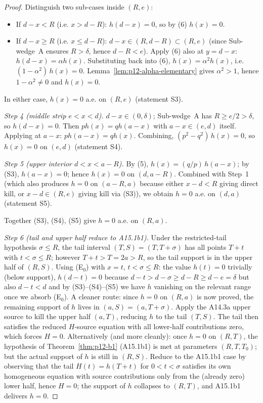 \begin{proof}
Distinguish two sub-cases inside $(R, e)$:
\begin{itemize}
\item If $d - x < R$ (i.e. $x > d - R$): $h(d - x) = 0$, so by (6)
$h(x) = 0$.
\item If $d - x \ge R$ (i.e. $x \le d - R$): $d - x \in (R, d - R)
\subset (R, e)$ (since Sub-wedge~A ensures $R > \delta$, hence
$d - R < e$).  Apply (6) also at $y = d - x$:
$h(d - x) = \alpha h(x)$.  Substituting back into (6),
$h(x) = \alpha^2 h(x)$, i.e. $(1 - \alpha^2)\, h(x) = 0$.
Lemma~\ref{lem:p12-alpha-elementary} gives $\alpha^2 > 1$, hence
$1 - \alpha^2 \ne 0$ and $h(x) = 0$.
\end{itemize}
In either case, $h(x) = 0$ a.e. on $(R, e)$ (statement S3).

\medskip
\noindent\emph{Step 4 (middle strip $e < x < d$).}
$d - x \in (0, \delta)$; Sub-wedge~A has $R \ge e/2 > \delta$, so
$h(d - x) = 0$.  Then $p h(x) = q h(a - x)$ with $a - x \in (e, d)$
itself.  Applying at $a - x$: $p h(a - x) = q h(x)$.  Combining,
$(p^2 - q^2)\, h(x) = 0$, so $h(x) = 0$ on $(e, d)$ (statement S4).

\medskip
\noindent\emph{Step 5 (upper interior $d < x < a - R$).}
By (5), $h(x) = (q/p)\, h(a - x)$; by (S3), $h(a - x) = 0$; hence
$h(x) = 0$ on $(d, a - R)$.  Combined with Step~1 (which also produces
$h = 0$ on $(a - R, a)$ because either $x - d < R$ giving direct kill,
or $x - d \in (R, e)$ giving kill via (S3)), we obtain
$h = 0$ a.e. on $(d, a)$ (statement S5).

Together (S3), (S4), (S5) give $h = 0$ a.e. on $(R, a)$.

\medskip
\noindent\emph{Step 6 (tail and upper half reduce to A15.1b1).}
Under the restricted-tail hypothesis $\sigma \le R$, the tail interval
$(T, S) = (T, T + \sigma)$ has all points $T + t$ with $t < \sigma \le R$;
however $T + t > T = 2a > R$, so the tail support is in the upper half
of $(R, S)$.  Using (E$_0$) with $x = t$, $t < \sigma \le R$: the value
$h(t) = 0$ trivially (below support), $h(d - t) = 0$ because
$d - t > d - \sigma \ge d - R \ge d - e = \delta$ but also
$d - t < d$ and by (S3)--(S4)--(S5) we have $h$ vanishing on the
relevant range once we absorb (E$_0$).  A cleaner route:
since $h = 0$ on $(R, a)$ is now proved, the remaining support of $h$
lives in $(a, S) = (a, T + \sigma)$.  Apply the A14.3a upper source to
kill the upper half $(a, T)$, reducing $h$ to the tail $(T, S)$.
The tail then satisfies the reduced $H$-source equation with all
lower-half contributions zero, which forces $H = 0$.
Alternatively (and more cleanly): once $h = 0$ on $(R, T)$, the
hypothesis of Theorem~\ref{thm:p12-b1} (A15.1b1) is met at parameters
$(R, T, T_0)$; but the actual support of $h$ is still in $(R, S)$.
Reduce to the A15.1b1 case by observing that the tail
$H(t) = h(T + t)$ for $0 < t < \sigma$ satisfies its own homogeneous
equation with source contributions only from the (already zero) lower
half, hence $H = 0$; the support of $h$ collapses to $(R, T)$, and
A15.1b1 delivers $h = 0$.
\end{proof}

